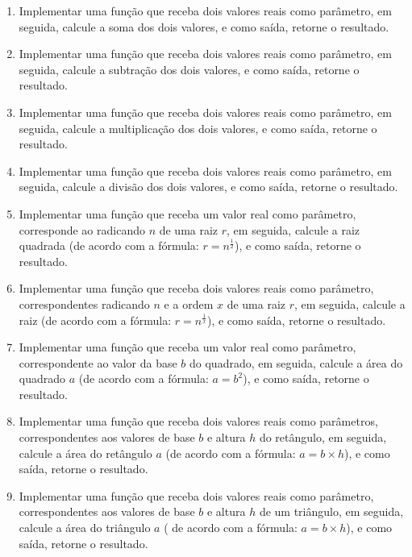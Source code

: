 \documentclass[11pt]{article}
\begin{document}
\begin{enumerate}
	\item Implementar uma função que receba dois valores reais como parâmetro, em seguida, calcule a
	soma dos dois valores, e como saída, retorne o resultado.
	
	\item  Implementar uma função que receba dois valores reais como parâmetro, em seguida, calcule a
	subtração dos dois valores, e como saída, retorne o resultado.
	
	\item  Implementar uma função que receba dois valores reais como parâmetro, em seguida, calcule a
	multiplicação dos dois valores, e como saída, retorne o resultado.
	
	\item Implementar uma função que receba dois valores reais como parâmetro, em seguida, calcule a
	divisão dos dois valores, e como saída, retorne o resultado.
	
	\item Implementar uma função que receba um valor real como parâmetro, corresponde ao radicando $n$
	de uma raiz $r$, em seguida, calcule a raiz quadrada (de acordo com a fórmula: $r = n^{\frac{1}{2}}$), e como
	saída, retorne o resultado.
	
	\item  Implementar uma função que receba dois valores reais como parâmetro, correspondentes
	radicando $n$ e a ordem $x$ de uma raiz $r$, em seguida, calcule a raiz (de acordo com a fórmula:
	$r = n^{\frac{1}{x}}$), e como saída, retorne o resultado.
	
	\item Implementar uma função que receba um valor real como parâmetro, correspondente ao valor da
	base $b$ do quadrado, em seguida, calcule a área do quadrado $a$ (de acordo com a fórmula: $a = b^{2}$),
	e como saída, retorne o resultado.
	
	\item  Implementar uma função que receba dois valores reais como parâmetros, correspondentes aos
	valores de base $b$ e altura $h$ do retângulo, em seguida, calcule a área do retângulo $a$ (de acordo
	com a fórmula: $a = b \times h$), e como saída, retorne o resultado.
	
	\item Implementar uma função que receba dois valores reais como parâmetro, correspondentes aos
	valores de base $b$ e altura $h$ de um triângulo, em seguida, calcule a área do triângulo $a$ ( de
	acordo com a fórmula: $a =b \times h$), e como saída, retorne o resultado.
	

\end{enumerate}
\end{document}
